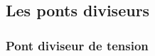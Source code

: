 \documentclass[../../main/main.tex]{subfiles}
\begin{document}
\begin{tcb*}[breakable]
\begin{isd}
{		}%
		\vspace{-15pt}
	\end{isd}
	\vspace{-20pt}
	\tcblower
	\begin{center}
	\end{center}
\end{tcb*}

\subsection{Les ponts diviseurs}


\subsubsection{Pont diviseur de tension}
\end{document}
